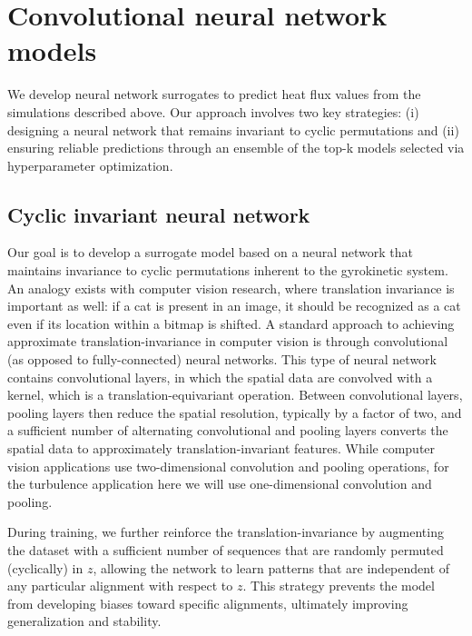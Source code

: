 \documentclass{jpp}
\begin{document}

\section{Convolutional neural network models}
\label{sec:CNN}

We develop neural network surrogates to predict heat flux values from the simulations described above. Our approach involves two key strategies: (i) designing a neural network that remains invariant to cyclic permutations and (ii) ensuring reliable predictions through an ensemble of the top-k models selected via hyperparameter optimization.

\subsection{Cyclic invariant neural network}
Our goal is to develop a surrogate model based on a neural network that maintains invariance to cyclic permutations inherent to the gyrokinetic system. 
An analogy exists with computer vision research, where translation invariance is important as well: if a cat is present in an image, it should be recognized as a cat even if its location within a bitmap is shifted.
A standard approach to achieving approximate translation-invariance in computer vision is through convolutional (as opposed to fully-connected) neural networks.
This type of neural network contains convolutional layers, in which the spatial data are convolved with a kernel, which is a translation-equivariant operation.
Between convolutional layers, pooling layers then reduce the spatial resolution, typically by a factor of two, and a sufficient number of alternating convolutional and pooling layers converts the spatial data to approximately translation-invariant features.
While computer vision applications use two-dimensional convolution and pooling operations, for the turbulence application here we will use one-dimensional convolution and pooling.

During training, we further reinforce the translation-invariance by augmenting the dataset with a sufficient number of sequences that are randomly permuted (cyclically) in $z$, allowing the network to learn patterns that are independent of any particular alignment with respect to $z$. This strategy prevents the model from developing biases toward specific alignments, ultimately improving generalization and stability.
\end{document}
